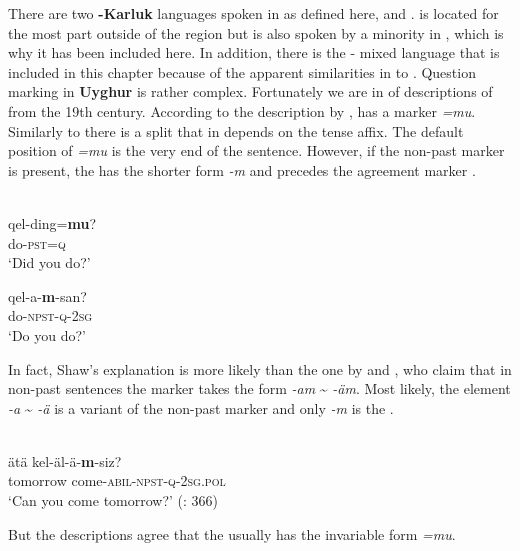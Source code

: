 There are two \textbf{-Karluk} languages spoken in  as defined here,  and .  is located for the most part outside of the region but is also spoken by a minority in , which is why it has been included here. In addition, there is the - mixed language  that is included in this chapter because of the apparent similarities in  to . Question marking in \textbf{Uyghur} is rather complex. Fortunately we are in  of descriptions of  from the 19th century. According to the description by \citet[56]{Shaw1878},  has a marker \textit{=mu}. Similarly to  there is a split that in  depends on the tense affix. The default position of \textit{=mu} is the very end of the sentence. However, if the non-past marker is present, the  has the shorter form \textit{-m} and precedes the agreement marker \citep[56]{Shaw1878}.

  
\ea%
    \label{ex:turk:25}
    \\
    \ea
    \gll qel-ding=\textbf{{mu}}?\\
    do-\textsc{pst}=\textsc{q}\\
    \glt ‘Did you do?’
    
    \ex
    \gll qel-a-\textbf{{m}}{-san?}\\
    do-\textsc{npst}-\textsc{q}-2\textsc{sg}\\
    \glt ‘Do you do?’ \citep[56]{Shaw1878}
    \z
    \z

In fact, Shaw’s explanation is more likely than the one by \citet[366]{TuohutiLitifu2012} and \citet[178]{Abdurehim2014}, who claim that in non-past sentences the marker takes the form \textit{-am} {\textasciitilde} \textit{-äm}. Most likely, the element \textit{-a} {\textasciitilde} \textit{-ä} is a variant of the non-past marker and only \textit{-m} is the .

\ea%
    \label{ex:turk:26}
    \\
    \gll ätä    kel-äl-ä-\textbf{{m}}{-siz?}\\
    tomorrow  come-\textsc{abil}-\textsc{npst}-\textsc{q}-2\textsc{sg.pol}\\
    \glt ‘Can you come tomorrow?’ (\citealt{TuohutiLitifu2012}: 366)
    \z

\noindent But the descriptions agree that the  usually has the invariable form \textit{=mu}.

